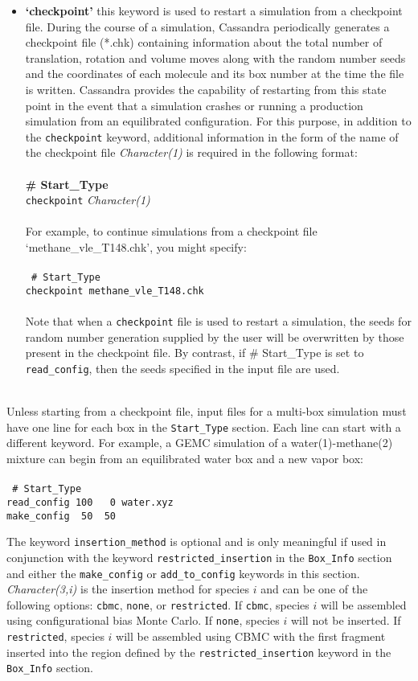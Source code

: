 \begin{itemize}
\item \textbf{`checkpoint'} this keyword is used to restart a simulation from a checkpoint file.
During the course of a simulation, Cassandra periodically generates a checkpoint file (*.chk)
 containing information about the total number of translation, rotation and volume moves along with the random number seeds and 
the coordinates of each molecule and its box number at the time the file is written. Cassandra provides
the capability of restarting from this state point in the event that a simulation crashes or 
running a production simulation from an equilibrated configuration. For this
purpose, in addition to the {\tt checkpoint} keyword, additional information in the form of the name of 
the checkpoint file {\it Character(1)} is required in the following format: \\ \\
%
{\bf \# Start\_Type} \\
{\tt checkpoint} {\it Character(1)} \\ \\
%
For example, to continue simulations from a checkpoint file `methane\_vle\_T148.chk', you might specify: \\ \\
%
\texttt{
\# Start\_Type \\
checkpoint methane\_vle\_T148.chk \\ } \\
%
Note that when a {\tt checkpoint} file is used to restart a simulation, the seeds for random number generation supplied by the user
will be overwritten by those present in the checkpoint file. By contrast, if \# Start\_Type is set to {\tt read\_config}, 
then the seeds specified in the input file are used.  \\ \\
%
\end{itemize}
Unless starting from a checkpoint file, input files for a multi-box simulation must have one line for each box in the \texttt{Start\_Type} section. Each line can start with a different keyword. For example, a GEMC simulation of a water(1)-methane(2) mixture can begin from an equilibrated water box and a new vapor box: \\ \\
%
\texttt{
\# Start\_Type \\
read\_config 100 \ \ 0 water.xyz \\
make\_config \ 50 \ 50 \\}

The keyword {\tt insertion\_method} is optional and is only meaningful if used in conjunction
with the keyword {\tt restricted\_insertion} in the {\tt Box\_Info} section and
either the {\tt make\_config} or {\tt add\_to\_config} keywords in this section.
{\it Character(3,i)} is the insertion method for species $i$ and can be one of the following options:
{\tt cbmc}, {\tt none}, or {\tt restricted}.
If {\tt cbmc}, species $i$ will be assembled using configurational bias Monte Carlo.
If {\tt none}, species $i$ will not be inserted.
If \texttt{restricted}, species $i$ will be assembled using CBMC
with the first fragment inserted into the region defined by 
the \texttt{restricted\_insertion} keyword in the \texttt{Box\_Info} section.
%
%
%
